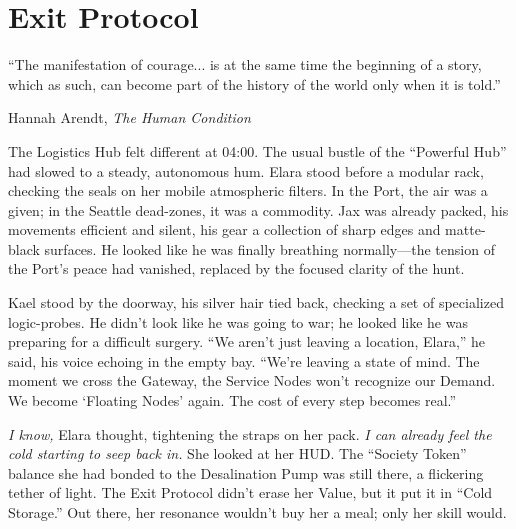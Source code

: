\chapter{Exit Protocol}
\label{chap:09}

\epigraph{“The manifestation of courage... is at the same time the beginning of a story, which as such, can become part of the history of the world only when it is told.”}{Hannah Arendt, \textit{The Human Condition}}


The Logistics Hub felt different at 04:00. The usual bustle of the ``Powerful Hub'' had slowed to a steady, autonomous hum. Elara stood before a modular rack, checking the seals on her mobile atmospheric filters. In the Port, the air was a given; in the Seattle dead-zones, it was a commodity. Jax was already packed, his movements efficient and silent, his gear a collection of sharp edges and matte-black surfaces. He looked like he was finally breathing normally—the tension of the Port's peace had vanished, replaced by the focused clarity of the hunt.

Kael stood by the doorway, his silver hair tied back, checking a set of specialized logic-probes. He didn't look like he was going to war; he looked like he was preparing for a difficult surgery. ``We aren't just leaving a location, Elara,'' he said, his voice echoing in the empty bay. ``We're leaving a state of mind. The moment we cross the Gateway, the Service Nodes won't recognize our Demand. We become `Floating Nodes' again. The cost of every step becomes real.''

\textit{I know,} Elara thought, tightening the straps on her pack. \textit{I can already feel the cold starting to seep back in.} She looked at her HUD. The ``Society Token'' balance she had bonded to the Desalination Pump was still there, a flickering tether of light. The Exit Protocol didn't erase her Value, but it put it in ``Cold Storage.'' Out there, her resonance wouldn't buy her a meal; only her skill would.



